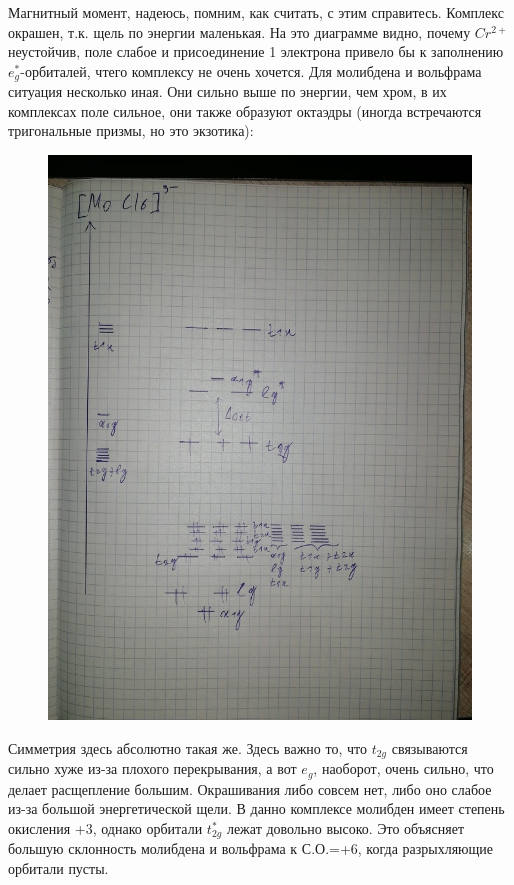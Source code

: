Магнитный момент, надеюсь, помним, как считать, с этим справитесь. Комплекс окрашен, т.к. щель по энергии маленькая. На это диаграмме видно, почему $Cr^{2+}$ неустойчив, поле слабое и присоединение 1 электрона привело бы к заполнению $e_g^*$-орбиталей, чтего комплексу не очень хочется. Для молибдена и вольфрама ситуация несколько иная. Они сильно выше по энергии, чем хром, в их комплексах поле сильное, они также образуют октаэдры (иногда встречаются тригональные призмы, но это экзотика):

\begin{figure}[H]
\centering
\includegraphics[scale=.300]{images/halogenides2.jpg}
\end{figure}

Симметрия здесь абсолютно такая же. Здесь важно то, что $t_{2g}$ связываются сильно хуже из-за плохого перекрывания, а вот $e_g$, наоборот, очень сильно, что делает расщепление большим. Окрашивания либо совсем нет, либо оно слабое из-за большой энергетической щели. В данно комплексе молибден имеет степень окисления +3, однако орбитали $t_{2g}^*$ лежат довольно высоко. Это объясняет большую склонность молибдена и вольфрама к С.О.=+6, когда разрыхляющие орбитали пусты.

